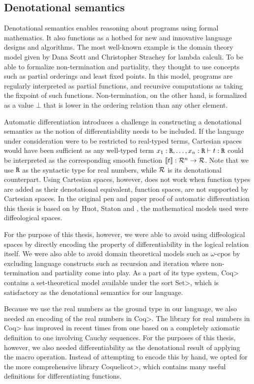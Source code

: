\subsection{Denotational semantics}
Denotational semantics enables reasoning about programs using formal mathematics.
It also functions as a hotbed for new and innovative language designs and algorithms.
The most well-known example is the domain theory model given by Dana Scott and Christopher Strachey\cite{Scott1977} for lambda calculi.
To be able to formalize non-termination and partiality, they thought to use concepts such as partial orderings and least fixed points\cite{aaby2020}.
In this model, programs are regularly interpreted as partial functions, and recursive computations as taking the fixpoint of such functions.
Non-termination, on the other hand, is formalized as a value $\bot$ that is lower in the ordering relation than any other element.

Automatic differentiation introduces a challenge in constructing a denotational semantics as the notion of differentiability needs to be included.
If the language under consideration were to be restricted to real-typed terms, Cartesian spaces would have been sufficient as any well-typed term $x_1 : \texttt{R}, \dots, x_n : \texttt{R} \vdash t : \texttt{R}$ could be interpreted as the corresponding smooth function $\llbracket t \rrbracket : \mathcal{R}^n \to \mathcal{R}$.
Note that we use $\texttt{R}$ as the syntactic type for real numbers, while $\mathcal{R}$ is its denotational counterpart.
Using Cartesian spaces, however, does not work when function types are added as their denotational equivalent, function spaces, are not supported by Cartesian spaces\cite{huot2020correctness}.
In the original pen and paper proof of automatic differentiation this thesis is based on by Huot, Staton and \Vakar{}\cite{huot2020correctness}, the mathematical models used were diffeological spaces.

For the purpose of this thesis, however, we were able to avoid using diffeological spaces by directly encoding the property of differentiability in the logical relation itself.
We were also able to avoid domain theoretical models such as $\omega$-cpos by excluding language constructs such as recursion and iteration where non-termination and partiality come into play.
As a part of its type system, \<Coq> contains a set-theoretical model available under the sort \<Set>, which is satisfactory as the denotational semantics for our language.

Because we use the real numbers as the ground type in our language, we also needed an encoding of the real numbers in \<Coq>.
The library for real numbers in \<Coq> has improved in recent times from one based on a completely axiomatic definition to one involving Cauchy sequences.
For the purposes of this thesis, however, we also needed differentiability as the denotational result of applying the macro operation.
Instead of attempting to encode this by hand, we opted for the more comprehensive library \<Coquelicot>\cite{Boldo2015CoquelicotAU}, which contains many useful definitions for differentiating functions.
